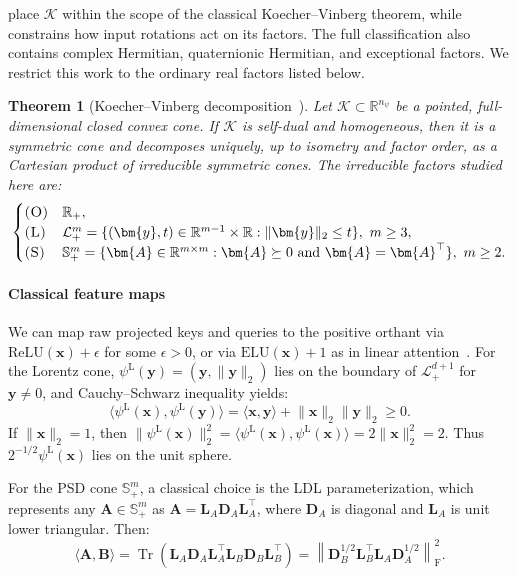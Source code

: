 \documentclass{article}
\newcommand{\1}{\bm{1}}
\newcommand{\norm}[1]{\lVert {#1} \rVert}
\newcommand{\lrangle}[1]{\langle#1\rangle}
\newcommand{\normf}[1]{\left\| #1 \right\|_{\mathrm{F}}}
\def\eps{{\epsilon}}
\def\vx{{\bm{x}}}
\def\vy{{\bm{y}}}
\def\mA{{\bm{A}}}
\def\mB{{\bm{B}}}
\def\mD{{\bm{D}}}
\def\mL{{\bm{L}}}
\def\gK{{\mathcal{K}}}
\def\gL{{\mathcal{L}}}
\def\sS{{\mathbb{S}}}
\newcommand{\R}{\mathbb{R}}
\DeclareMathOperator{\Tr}{Tr}
\newtheorem{theorem}{Theorem}
\theoremstyle{definition}
\begin{document}
 place $\gK$ within the scope of the classical
Koecher--Vinberg theorem, while  constrains how input rotations act on its factors.
The full classification also contains complex Hermitian, quaternionic Hermitian, and exceptional
factors. We restrict this work to the ordinary real factors listed below.
\begin{theorem}[Koecher--Vinberg decomposition~\citep{koecher57positivitatsbereiche,vinberg63homogeneous,faraut94analysis}]
  \label{thm:kv}
  Let $\gK\subset\R^{n_\psi}$ be a pointed, full-dimensional closed convex cone. If $\gK$ is self-dual
  and homogeneous, then it is a symmetric cone and decomposes uniquely, up to isometry and factor
  order, as a Cartesian product of irreducible symmetric cones. The irreducible factors studied here
  are:
  \[
    \begin{cases}
      \textnormal{\textsc{(O)}} & \R_+,                                \\
      \textnormal{\textsc{(L)}} & \gL^m_+
      = \{(\vy,t)\in\R^{m-1}\times\R : \norm{\vy}_2 \le t\},\  m\ge 3, \\
      \textnormal{\textsc{(S)}} & \sS^m_+
      = \{\mA\in\R^{m\times m} : \mA\succeq 0 \text{ and } \mA=\mA^{\top}\},\ m\ge 2.
    \end{cases}
  \]
\end{theorem}

\paragraph{Classical feature maps}
We can map raw projected keys and queries to the positive orthant via
$\mathrm{ReLU}(\vx)+\eps$ for some $\eps>0$, or via
$\mathrm{ELU}(\vx)+1$ as in linear attention~\citep{katharopoulos20transformers}. For the Lorentz
cone, $\psi^{\mathrm L}(\vy)=(\vy,\norm{\vy}_2)$ lies on the boundary of $\gL^{d+1}_+$ for
$\vy\ne0$, and Cauchy--Schwarz inequality yields:
\[
  \lrangle{\psi^{\mathrm L}(\vx),\psi^{\mathrm L}(\vy)}
  = \lrangle{\vx,\vy}+\norm{\vx}_2\norm{\vy}_2 \ge 0.
\]
If $\norm{\vx}_2=1$, then
$\norm{\psi^{\mathrm L}(\vx)}_2^2
 =\lrangle{\psi^{\mathrm L}(\vx),\psi^{\mathrm L}(\vx)}
 =2\norm{\vx}_2^2=2$.
Thus $2^{-1/2}\psi^{\mathrm L}(\vx)$ lies on the unit sphere.\par

For the PSD cone $\sS^m_+$, a classical choice is the LDL parameterization, which represents any
$\mA \in \sS^m_+$ as $\mA = \mL_A \mD_A \mL_A^\top$, where $\mD_A$ is diagonal and $\mL_A$ is unit
lower triangular. Then:
\[
\lrangle{\mA,\mB} = \Tr\!\left(\mL_A \mD_A \mL_A^\top \mL_B \mD_B
  \mL_B^\top\right) = \normf{\mD_B^{1/2}\mL_B^\top \mL_A \mD_A^{1/2}}^2.
\] 
\end{document}
